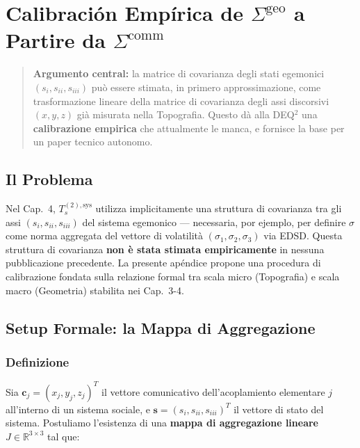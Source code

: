 \chapter{\texorpdfstring{Calibración Empírica de
\(\Sigma^{\text{geo}}\) a Partire da
\(\Sigma^{\text{comm}}\)}{Calibración Empírica de \textbackslash Sigma\^{}\{\textbackslash text\{geo\}\} a Partire da \textbackslash Sigma\^{}\{\textbackslash text\{comm\}\}}}\label{calibrazione-empirica-di-sigmatextgeo-a-partire-da-sigmatextcomm}

\begin{quote}
\textbf{Argumento central:} la matrice di covarianza degli stati
egemonici \((s_i, s_{ii}, s_{iii})\) può essere stimata, in primero
approssimazione, come trasformazione lineare della matrice di covarianza
degli assi discorsivi \((x, y, z)\) già misurata nella Topografia.
Questo dà alla DEQ$^2$ una \textbf{calibrazione empirica} che attualmente
le manca, e fornisce la base per un paper tecnico autonomo.
\end{quote}



\section{Il Problema}\label{il-problema}

Nel Cap.~4, \(T_s^{(2),\text{sys}}\) utilizza implicitamente una
struttura di covarianza tra gli assi \((s_i, s_{ii}, s_{iii})\) del
sistema egemonico --- necessaria, por ejemplo, per definire \(\sigma\)
come norma aggregata del vettore di volatilità
\((\sigma_1, \sigma_2, \sigma_3)\) via EDSD. Questa struttura di
covarianza \textbf{non è stata stimata empiricamente} in nessuna
pubblicazione precedente. La presente apéndice propone una procedura di
calibrazione fondata sulla relazione formal tra scala micro
(Topografia) e scala macro (Geometria) stabilita nei Cap.~3-4.



\section{Setup Formale: la Mappa di
Aggregazione}\label{setup-formal-la-mappa-di-aggregazione}

\subsection{Definizione}\label{definición}

Sia \(\mathbf{c}_j = (x_j, y_j, z_j)^T\) il vettore comunicativo
dell'acoplamiento elementare \(j\) all'interno di un sistema sociale, e
\(\mathbf{s} = (s_i, s_{ii}, s_{iii})^T\) il vettore di stato del
sistema. Postuliamo l'esistenza di una \textbf{mappa di aggregazione
lineare} \(J \in \mathbb{R}^{3 \times 3}\) tal que:

